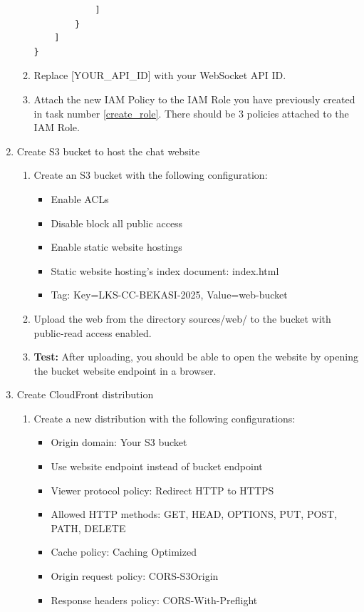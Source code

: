 \documentclass{article}
\begin{document}
\begin{enumerate}
\begin{enumerate}
\begin{verbatim}
            ]
        }
    ]
}
    \end{verbatim}
    \item Replace [YOUR\_API\_ID] with your WebSocket API ID.
    \item Attach the new IAM Policy to the IAM Role you have previously created in task number \ref{create_role}. There should be 3 policies attached to the IAM Role.
    \end{enumerate}
  \item Create S3 bucket to host the chat website
    \begin{enumerate}
      \item Create an S3 bucket with the following configuration:
      \begin{itemize}
        \item Enable ACLs
        \item Disable block all public access
        \item Enable static website hostings
        \item Static website hosting's index document: index.html
        \item Tag: Key=LKS-CC-BEKASI-2025, Value=web-bucket
      \end{itemize}
      \item Upload the web from the directory sources/web/ to the bucket with public-read access enabled.
      \item {\color{red}\textbf{Test:}} After uploading, you should be able to open the website by opening the bucket website endpoint in a browser.
    \end{enumerate}
  \item Create CloudFront distribution
    \begin{enumerate}
      \item Create a new distribution with the following configurations:
      \begin{itemize}
        \item Origin domain: Your S3 bucket
        \item Use website endpoint instead of bucket endpoint
        \item Viewer protocol policy: Redirect HTTP to HTTPS
        \item Allowed HTTP methods: GET, HEAD, OPTIONS, PUT, POST, PATH, DELETE
        \item Cache policy: Caching Optimized
        \item Origin request policy: CORS-S3Origin
        \item Response headers policy: CORS-With-Preflight

\end{itemize}
\end{enumerate}
\end{enumerate}
\end{document}
